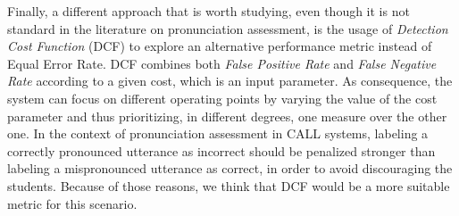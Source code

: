 Finally, a different approach
that is worth studying, even though it is not standard in the literature
on pronunciation assessment,
is the usage of \textit{Detection Cost Function} (DCF) %
to explore an alternative performance metric
instead of Equal Error Rate.
DCF combines both \textit{False Positive Rate} and \textit{False Negative Rate}
according to a given cost, which is an input parameter.
As consequence, the system can focus on different operating points
by varying the value of the cost parameter and thus prioritizing,
in different degrees, one measure over the other one.
In the context of pronunciation assessment in
CALL systems, labeling a correctly pronounced utterance as incorrect should be
penalized stronger than labeling a mispronounced utterance as correct, in order
to avoid discouraging the students. Because of those reasons,
we think that DCF
would be a more suitable metric for this scenario.

